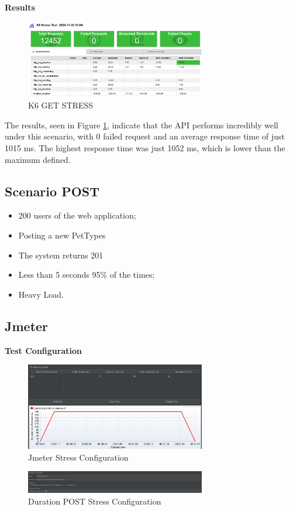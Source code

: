 \documentclass[a4paper,11pt,openright,BCOR=15mm]{scrbook}
\begin{document}
		
		
		\textbf{Results}
		\begin{figure}[H]
			\centering
			\includegraphics[width=0.7\textwidth]{figs/Performance/Results/K6 GET STRESS.png}
			\caption{K6 GET STRESS}
			\label{fig:K6-GET-STRESS}
		\end{figure}
		The results, seen in Figure \ref{fig:K6-GET-STRESS}, indicate that the API performs incredibly well under this scenario, with 0 failed request and an average response time of just 1015 ms. The highest response time was just 1052 ms, which is lower than the maximum defined.

		\subsection{Scenario POST}
		\begin{itemize}
			\item 200 users of the web application;
			\item Posting a new PetTypes
			\item The system returns 201
			\item Less than 5 seconds 95\% of the times;
			\item Heavy Load.
		\end{itemize}

		\subsection{Jmeter}
		\textbf{Test Configuration}
		\begin{figure}[H]
			\centering
			\includegraphics[width=0.7\textwidth]{figs/Performance/Test Configuration/JMETER-STRESS.png}
			\caption{Jmeter Stress Configuration}
			\label{fig:JMETER-STRESS-POST}
		\end{figure}
		\begin{figure}[H]
			\centering
			\includegraphics[width=0.7\textwidth]{figs/Performance/Test Configuration/Duration-Stress.png}
			\caption{Duration POST Stress Configuration}
			\label{fig:DurationPostStress}
		\end{figure}
		
\end{document}
